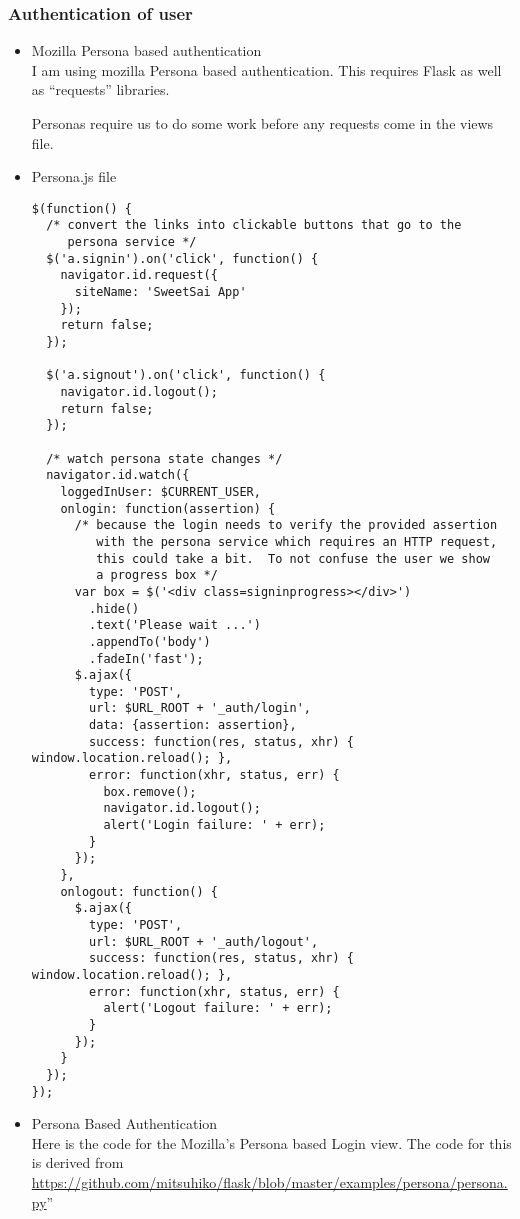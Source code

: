 \documentclass[11pt]{article}
\begin{document}
\subsubsection{Authentication of user}
\label{sec-4-3-3}
\begin{itemize}

\item Mozilla Persona based authentication\\
\label{sec-4-3-3-1}%
I am using mozilla Persona based authentication. This requires Flask
as well as ``requests'' libraries.

Personas require us to do some work before any requests come in the views
file.

\item Persona.js file\\
\label{sec-4-3-3-2}%
\begin{verbatim}
$(function() {
  /* convert the links into clickable buttons that go to the
     persona service */
  $('a.signin').on('click', function() {
    navigator.id.request({
      siteName: 'SweetSai App'
    });
    return false;
  });

  $('a.signout').on('click', function() {
    navigator.id.logout();
    return false;
  });

  /* watch persona state changes */
  navigator.id.watch({
    loggedInUser: $CURRENT_USER,
    onlogin: function(assertion) {
      /* because the login needs to verify the provided assertion
         with the persona service which requires an HTTP request,
         this could take a bit.  To not confuse the user we show
         a progress box */
      var box = $('<div class=signinprogress></div>')
        .hide()
        .text('Please wait ...')
        .appendTo('body')
        .fadeIn('fast');
      $.ajax({
        type: 'POST',
        url: $URL_ROOT + '_auth/login',
        data: {assertion: assertion},
        success: function(res, status, xhr) { window.location.reload(); },
        error: function(xhr, status, err) {
          box.remove();
          navigator.id.logout();
          alert('Login failure: ' + err);
        }
      });
    },
    onlogout: function() {
      $.ajax({
        type: 'POST',
        url: $URL_ROOT + '_auth/logout',
        success: function(res, status, xhr) { window.location.reload(); },
        error: function(xhr, status, err) {
          alert('Logout failure: ' + err);
        }
      });
    }
  });
});
\end{verbatim}


\item Persona Based Authentication\\
\label{sec-4-3-3-3}%
Here is the code for the Mozilla's Persona based Login view. The code
for this is derived from \href{https://github.com/mitsuhiko/flask/blob/master/examples/persona/persona.py}{https://github.com/mitsuhiko/flask/blob/master/examples/persona/persona.py}''


\end{itemize}
\end{document}
